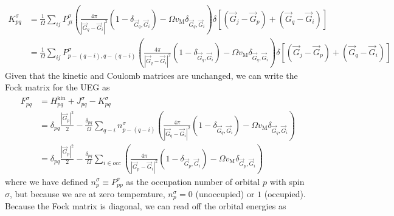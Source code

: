 \begin{align}
K_{ p q}^\sigma&= \frac{1}{\Omega}  \sum_{i j} P_{j i}^\sigma \left(\frac{4 \pi}{\left|\vec{G}_q-\vec{G}_i\right|^2} \left(1-\delta_{\vec{G}_q,\vec{G}_i}\right) - \Omega v_{\mathrm{M}}\delta_{\vec{G}_q,\vec{G}_i}\right) \delta\left[\left(\vec{G}_j-\vec{G}_p\right)+\left(\vec{G}_q-\vec{G}_i\right)\right] \label{K_exchange_inter} \\
&= \frac{1}{\Omega}  \sum_{i j} P_{p-(q-i), q -(q-i)}^\sigma \left(\frac{4 \pi}{\left|\vec{G}_q-\vec{G}_i\right|^2} \left(1-\delta_{\vec{G}_q,\vec{G}_i}\right) - \Omega v_{\mathrm{M}}\delta_{\vec{G}_q,\vec{G}_i}\right) \delta\left[\left(\vec{G}_j-\vec{G}_p\right)+\left(\vec{G}_q-\vec{G}_i\right)\right] 
\end{align}
Given that the kinetic and Coulomb matrices are unchanged, we can write the Fock matrix for the UEG as
\begin{align}
F_{ p q}^\sigma & = H_{ p q}^{\mathrm{kin}} + J_{ p q}^\sigma - K_{ p q}^\sigma \\
& = \delta_{ p q} \frac{|\vec{G}_p|^2}{2} -\frac{\delta_{pq}}{\Omega} \sum_{q-i} n^\sigma_{p-(q-i)} \left(\frac{4 \pi}{\left|\vec{G}_q-\vec{G}_i\right|^2} \left(1-\delta_{\vec{G}_q,\vec{G}_i}\right) - \Omega v_{\mathrm{M}}\delta_{\vec{G}_q,\vec{G}_i}\right) \\
& = \delta_{ p q} \frac{|\vec{G}_p|^2}{2} -\frac{\delta_{pq}}{\Omega} \sum_{i\in occ} \left(\frac{4 \pi}{\left|\vec{G}_p-\vec{G}_i\right|^2} \left(1-\delta_{\vec{G}_p,\vec{G}_i}\right) - \Omega v_{\mathrm{M}}\delta_{\vec{G}_p,\vec{G}_i}\right) 
\end{align}
where we have defined $n^\sigma_{p} \equiv P_{pp}^\sigma$ as the occupation number of orbital $p$ with spin $\sigma$, but because we are at zero temperature, $n^\sigma_{p}=0$ (unoccupied) or $1$ (occupied). Because the Fock matrix is diagonal, we can read off the orbital energies as
